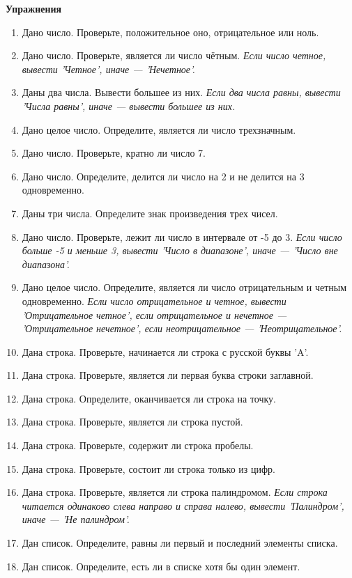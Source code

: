 \documentclass[a4,12pt]{article}
\theoremstyle{remark}
\begin{document}
\textbf{Упражнения}
\begin{enumerate}
    \item Дано число. Проверьте, положительное оно, отрицательное или ноль.
    \item Дано число. Проверьте, является ли число чётным. \textit{Если число четное, вывести 'Четное', иначе — 'Нечетное'.}
    \item Даны два числа. Вывести большее из них. \textit{Если два числа равны, вывести 'Числа равны', иначе — вывести большее из них.}
    \item Дано целое число. Определите, является ли число трехзначным.
    \item Дано число. Проверьте, кратно ли число 7.
    \item Дано число. Определите, делится ли число на 2 и не делится на 3 одновременно.
    \item Даны три числа. Определите знак произведения трех чисел.
    \item Дано число. Проверьте, лежит ли число в интервале от -5 до 3. \textit{Если число больше -5 и меньше 3, вывести 'Число в диапазоне', иначе — 'Число вне диапазона'.}
    \item Дано целое число. Определите, является ли число отрицательным и четным одновременно. \textit{Если число отрицательное и четное, вывести 'Отрицательное четное', если отрицательное и нечетное — 'Отрицательное нечетное', если неотрицательное — 'Неотрицательное'.}
    \item Дана строка. Проверьте, начинается ли строка с русской буквы 'A'.
    \item Дана строка. Проверьте, является ли первая буква строки заглавной.
    \item Дана строка. Определите, оканчивается ли строка на точку.
    \item Дана строка. Проверьте, является ли строка пустой.
    \item Дана строка. Проверьте, содержит ли строка пробелы.
    \item Дана строка. Проверьте, состоит ли строка только из цифр.
    \item Дана строка. Проверьте, является ли строка палиндромом. \textit{Если строка читается одинаково слева направо и справа налево, вывести 'Палиндром', иначе — 'Не палиндром'.}
    \item Дан список. Определите, равны ли первый и последний элементы списка.
    \item Дан список. Определите, есть ли в списке хотя бы один элемент.

\end{enumerate}
\end{document}
